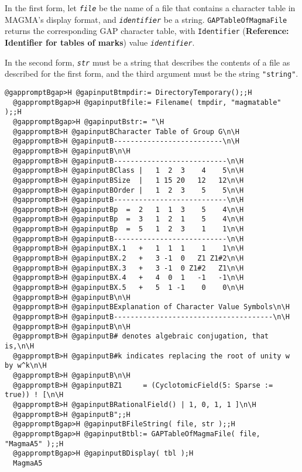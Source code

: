 \documentclass[a4paper,11pt]{report}
\begin{document}
{{{ In the first form, let \mbox{\texttt{\mdseries\slshape file}} be the name of a file that contains a character table in \textsf{MAGMA}'s display format, and \mbox{\texttt{\mdseries\slshape identifier}} be a string. \texttt{GAPTableOfMagmaFile} returns the corresponding \textsf{GAP} character table, with \texttt{Identifier} (\textbf{Reference: Identifier for tables of marks}) value \mbox{\texttt{\mdseries\slshape identifier}}. 

 In the second form, \mbox{\texttt{\mdseries\slshape str}} must be a string that describes the contents of a file as described for the
first form, and the third argument must be the string \texttt{"string"}. 

 
\begin{Verbatim}[commandchars=@BH,fontsize=\small,frame=single,label=Example]
  @gappromptBgap>H @gapinputBtmpdir:= DirectoryTemporary();;H
  @gappromptBgap>H @gapinputBfile:= Filename( tmpdir, "magmatable" );;H
  @gappromptBgap>H @gapinputBstr:= "\H
  @gappromptB>H @gapinputBCharacter Table of Group G\n\H
  @gappromptB>H @gapinputB--------------------------\n\H
  @gappromptB>H @gapinputB\n\H
  @gappromptB>H @gapinputB---------------------------\n\H
  @gappromptB>H @gapinputBClass |   1  2  3    4    5\n\H
  @gappromptB>H @gapinputBSize  |   1 15 20   12   12\n\H
  @gappromptB>H @gapinputBOrder |   1  2  3    5    5\n\H
  @gappromptB>H @gapinputB---------------------------\n\H
  @gappromptB>H @gapinputBp  =  2   1  1  3    5    4\n\H
  @gappromptB>H @gapinputBp  =  3   1  2  1    5    4\n\H
  @gappromptB>H @gapinputBp  =  5   1  2  3    1    1\n\H
  @gappromptB>H @gapinputB---------------------------\n\H
  @gappromptB>H @gapinputBX.1   +   1  1  1    1    1\n\H
  @gappromptB>H @gapinputBX.2   +   3 -1  0   Z1 Z1#2\n\H
  @gappromptB>H @gapinputBX.3   +   3 -1  0 Z1#2   Z1\n\H
  @gappromptB>H @gapinputBX.4   +   4  0  1   -1   -1\n\H
  @gappromptB>H @gapinputBX.5   +   5  1 -1    0    0\n\H
  @gappromptB>H @gapinputB\n\H
  @gappromptB>H @gapinputBExplanation of Character Value Symbols\n\H
  @gappromptB>H @gapinputB--------------------------------------\n\H
  @gappromptB>H @gapinputB\n\H
  @gappromptB>H @gapinputB# denotes algebraic conjugation, that is,\n\H
  @gappromptB>H @gapinputB#k indicates replacing the root of unity w by w^k\n\H
  @gappromptB>H @gapinputB\n\H
  @gappromptB>H @gapinputBZ1     = (CyclotomicField(5: Sparse := true)) ! [\n\H
  @gappromptB>H @gapinputBRationalField() | 1, 0, 1, 1 ]\n\H
  @gappromptB>H @gapinputB";;H
  @gappromptBgap>H @gapinputBFileString( file, str );;H
  @gappromptBgap>H @gapinputBtbl:= GAPTableOfMagmaFile( file, "MagmaA5" );;H
  @gappromptBgap>H @gapinputBDisplay( tbl );H
  MagmaA5
  

\end{Verbatim}}}}
\end{document}
